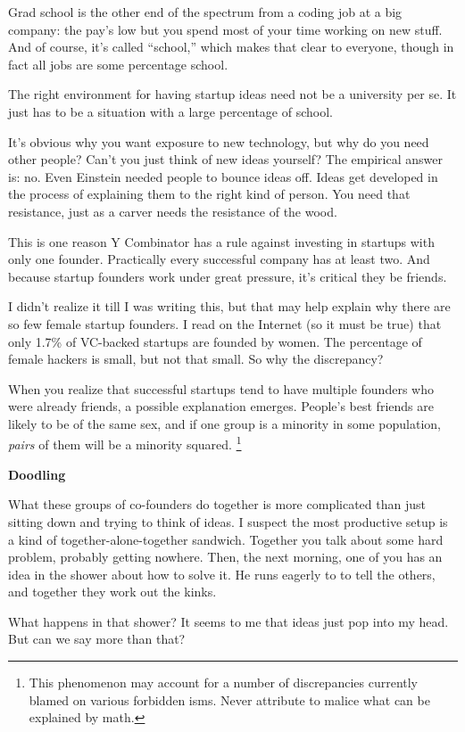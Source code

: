\documentclass[12pt]{book}
\begin{document}
Grad school is the other end of the spectrum from a coding job at a big
company: the pay's low but you spend most of your time working on new
stuff. And of course, it's called ``school,'' which makes that clear to
everyone, though in fact all jobs are some percentage school.

The right environment for having startup ideas need not be a university
per se. It just has to be a situation with a large percentage of school.

It's obvious why you want exposure to new technology, but why do you
need other people? Can't you just think of new ideas yourself? The
empirical answer is: no. Even Einstein needed people to bounce ideas
off. Ideas get developed in the process of explaining them to the right
kind of person. You need that resistance, just as a carver needs the
resistance of the wood.

This is one reason Y Combinator has a rule against investing in startups
with only one founder. Practically every successful company has at least
two. And because startup founders work under great pressure, it's
critical they be friends.

I didn't realize it till I was writing this, but that may help explain
why there are so few female startup founders. I read on the Internet (so
it must be true) that only 1.7\% of VC-backed startups are founded by
women. The percentage of female hackers is small, but not that small. So
why the discrepancy?

When you realize that successful startups tend to have multiple founders
who were already friends, a possible explanation emerges. People's best
friends are likely to be of the same sex, and if one group is a minority
in some population, \emph{pairs} of them will be a minority squared.
\footnote{This phenomenon may account for a number of discrepancies
currently blamed on various forbidden isms. Never attribute to malice
what can be explained by math.}

\textbf{Doodling}

What these groups of co-founders do together is more complicated than
just sitting down and trying to think of ideas. I suspect the most
productive setup is a kind of together-alone-together sandwich. Together
you talk about some hard problem, probably getting nowhere. Then, the
next morning, one of you has an idea in the shower about how to solve
it. He runs eagerly to to tell the others, and together they work out
the kinks.

What happens in that shower? It seems to me that ideas just pop into my
head. But can we say more than that?
\end{document}
